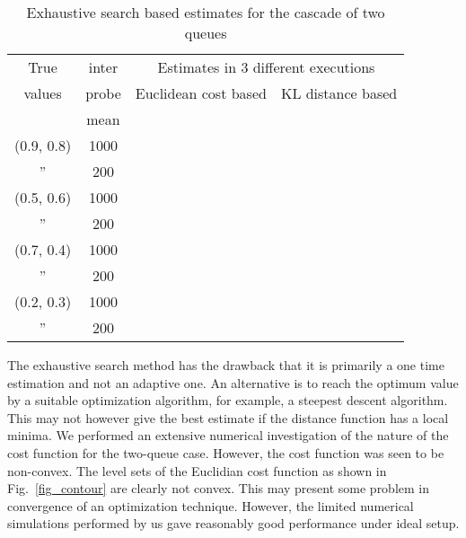 \documentclass[11pt]{article}
\begin{document}
{\footnotesize{
\begin{table*}
  \caption{Exhaustive search based estimates for the cascade of two
    queues}
  \label{tbl:two-queue-exhaustive}
  \begin{center}
  \begin{tabular}{||c||c||c|c|c||c|c|c||}
    \hline \hline
    True & inter &
    \multicolumn{6}{|c||}{Estimates in 3 different executions}\\
    \cline{3-8}
    values & probe & \multicolumn{3}{|c||}{Euclidean cost based}& 
    \multicolumn{3}{|c||}{KL distance based} \\
    \cline{3-8}
     & mean & 
    &  & 
    & 
    &  & \\
    \hline \hline
    (0.9, 0.8) & 1000 &  &  &  &  &  & \\ \hline
    '' &  200  &  &  &  &  &  & \\\hline
    (0.5, 0.6) & 1000 &  &  &  &  &  &  \\ \hline
    '' &  200 &  &  &   &  &  &  \\ \hline
    (0.7, 0.4) & 1000 &  &  &&
     &  &  \\\hline
    '' &  200 &  &  &  &  &  &  \\ \hline
    (0.2, 0.3) & 1000 &  &  &  &  &  &  \\ \hline
    '' &  200 &  &  && 
     & &  \\\hline
    \hline
  \end{tabular}
  \end{center}
\end{table*}
}}


The exhaustive search method has the drawback that it is primarily a
one time estimation and not an adaptive one. An alternative is to
reach the optimum value by a suitable optimization algorithm, for
example, a steepest descent algorithm. This may not however give the
best estimate if the distance function has a local minima. We
performed an extensive numerical investigation of the nature of the
cost function for the two-queue case. However, the cost function was seen to be non-convex. The level sets
of the Euclidian cost function as shown in Fig.~\ref{fig_contour} are
clearly not convex. This may present some problem in convergence of an
optimization technique. However, the limited numerical simulations
performed by us gave reasonably good performance under ideal setup.
\end{document}
